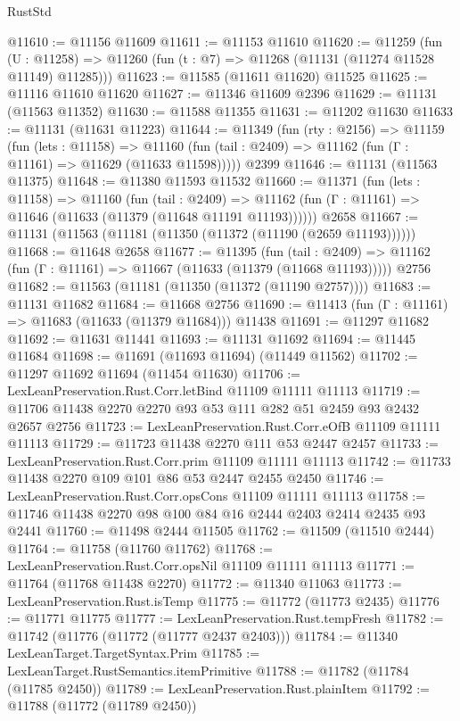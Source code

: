 \begin{lexlean}{RustStd}
\begin{coremodule}
@11610 := @11156 @11609
@11611 := @11153 @11610
@11620 := @11259
    (fun (U : @11258) => @11260 (fun (t : @7) => @11268 (@11131 (@11274 @11528 @11149) @11285)))
@11623 := @11585 (@11611 @11620) @11525
@11625 := @11116 @11610 @11620
@11627 := @11346 @11609 @2396
@11629 := @11131 (@11563 @11352)
@11630 := @11588 @11355
@11631 := @11202 @11630
@11633 := @11131 (@11631 @11223)
@11644 := @11349
    (fun (rty : @2156) =>
    @11159
      (fun (lets : @11158) =>
      @11160 (fun (tail : @2409) => @11162 (fun (Γ : @11161) => @11629 (@11633 @11598)))))
    @2399
@11646 := @11131 (@11563 @11375)
@11648 := @11380 @11593 @11532
@11660 := @11371
    (fun (lets : @11158) =>
    @11160
      (fun (tail : @2409) =>
      @11162 (fun (Γ : @11161) => @11646 (@11633 (@11379 (@11648 @11191 @11193))))))
    @2658
@11667 := @11131 (@11563 (@11181 (@11350 (@11372 (@11190 (@2659 @11193))))))
@11668 := @11648 @2658
@11677 := @11395
    (fun (tail : @2409) => @11162 (fun (Γ : @11161) => @11667 (@11633 (@11379 (@11668 @11193)))))
    @2756
@11682 := @11563 (@11181 (@11350 (@11372 (@11190 @2757))))
@11683 := @11131 @11682
@11684 := @11668 @2756
@11690 := @11413 (fun (Γ : @11161) => @11683 (@11633 (@11379 @11684))) @11438
@11691 := @11297 @11682
@11692 := @11631 @11441
@11693 := @11131 @11692
@11694 := @11445 @11684
@11698 := @11691 (@11693 @11694) (@11449 @11562)
@11702 := @11297 @11692 @11694 (@11454 @11630)
@11706 := LexLeanPreservation.Rust.Corr.letBind @11109 @11111 @11113
@11719 := @11706 @11438 @2270 @2270 @93 @53 @111 @282 @51 @2459 @93 @2432 @2657 @2756
@11723 := LexLeanPreservation.Rust.Corr.eOfB @11109 @11111 @11113
@11729 := @11723 @11438 @2270 @111 @53 @2447 @2457
@11733 := LexLeanPreservation.Rust.Corr.prim @11109 @11111 @11113
@11742 := @11733 @11438 @2270 @109 @101 @86 @53 @2447 @2455 @2450
@11746 := LexLeanPreservation.Rust.Corr.opsCons @11109 @11111 @11113
@11758 := @11746 @11438 @2270 @98 @100 @84 @16 @2444 @2403 @2414 @2435 @93 @2441
@11760 := @11498 @2444 @11505
@11762 := @11509 (@11510 @2444)
@11764 := @11758 (@11760 @11762)
@11768 := LexLeanPreservation.Rust.Corr.opsNil @11109 @11111 @11113
@11771 := @11764 (@11768 @11438 @2270)
@11772 := @11340 @11063
@11773 := LexLeanPreservation.Rust.isTemp
@11775 := @11772 (@11773 @2435)
@11776 := @11771 @11775
@11777 := LexLeanPreservation.Rust.tempFresh
@11782 := @11742 (@11776 (@11772 (@11777 @2437 @2403)))
@11784 := @11340 LexLeanTarget.TargetSyntax.Prim
@11785 := LexLeanTarget.RustSemantics.itemPrimitive
@11788 := @11782 (@11784 (@11785 @2450))
@11789 := LexLeanPreservation.Rust.plainItem
@11792 := @11788 (@11772 (@11789 @2450))

\end{coremodule}
\end{lexlean}
